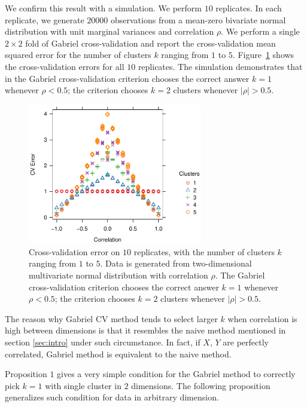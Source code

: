 \documentclass[12pt]{article}
\begin{document}
We confirm this result with a simulation.  We perform $10$ replicates.  In each
replicate, we generate $20000$ observations from a mean-zero bivariate normal
distribution with unit marginal variances and correlation $\rho$.  We perform
a single $2 \times 2$ fold of Gabriel cross-validation and report the
cross-validation mean squared error for the number of clusters $k$ ranging
from $1$ to $5$.  Figure~\ref{fig:nullcorr-equal} shows the cross-validation
errors for all $10$ replicates.  The simulation demonstrates that in the
Gabriel cross-validation criterion chooses the correct answer $k = 1$ whenever
$\rho < 0.5$; the criterion chooses $k = 2$ clusters whenever $|\rho| > 0.5$.

\begin{figure}[H]
\centering
\includegraphics[width=3in]{demo/nullcorr/equal.pdf}
\caption{Cross-validation error on $10$ replicates, with the number of
clusters $k$ ranging from $1$ to $5$.  Data is generated from two-dimensional
multivariate normal distribution with correlation $\rho$.  The Gabriel
cross-validation criterion chooses the correct answer $k = 1$ whenever
$\rho < 0.5$; the criterion chooses $k = 2$ clusters whenever $|\rho| > 0.5$.}
\label{fig:nullcorr-equal}
\end{figure}

The reason why Gabriel CV method tends to select larger $k$ when correlation is high 
between dimensions is that it resembles the naive method mentioned in section \ref{sec:intro} 
under such circumstance. In fact, if $X$, $Y$ are perfectly correlated, Gabriel method is 
equivalent to the naive method.

Proposition $1$ gives a very simple condition for the Gabriel method to correctly 
pick $k=1$ with single cluster in $2$ dimensions. The following proposition generalizes
such condition for data in arbitrary dimension. 
\end{document}
